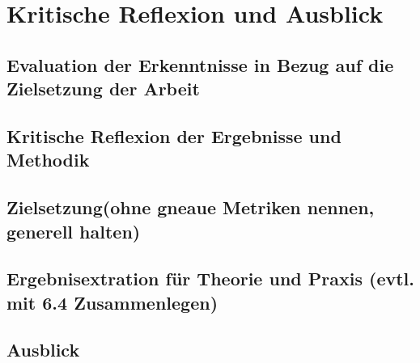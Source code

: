\chapter{Kritische Reflexion und Ausblick}
\section{Evaluation der Erkenntnisse in Bezug auf die Zielsetzung der Arbeit }
\section{Kritische Reflexion der Ergebnisse und Methodik}
\section{Zielsetzung(ohne gneaue Metriken nennen, generell halten)}
\section{Ergebnisextration für Theorie und Praxis (evtl. mit 6.4 Zusammenlegen)}
\section{Ausblick}